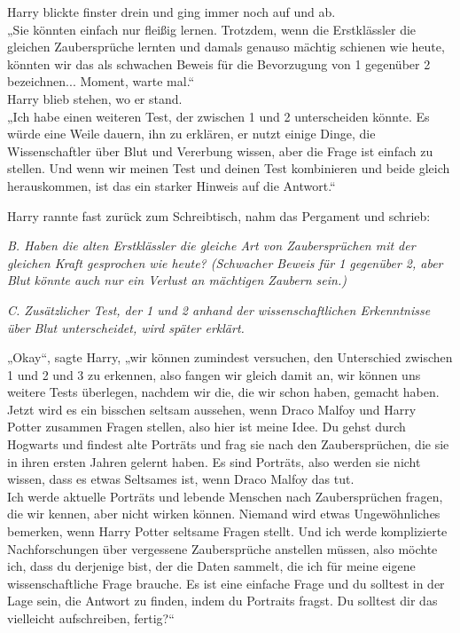 {Harry blickte finster drein und ging immer noch auf und ab.\\ „Sie könnten einfach nur fleißig lernen. Trotzdem, wenn die Erstklässler die gleichen Zaubersprüche lernten und damals genauso mächtig schienen wie heute, könnten wir das als schwachen Beweis für die Bevorzugung von 1 gegenüber 2 bezeichnen... Moment, warte mal.“\\ Harry blieb stehen, wo er stand.\\ „Ich habe einen weiteren Test, der zwischen 1 und 2 unterscheiden könnte. Es würde eine Weile dauern, ihn zu erklären, er nutzt einige Dinge, die Wissenschaftler über Blut und Vererbung wissen, aber die Frage ist einfach zu stellen. Und wenn wir meinen Test und deinen Test kombinieren und beide gleich herauskommen, ist das ein starker Hinweis auf die Antwort.“

Harry rannte fast zurück zum Schreibtisch, nahm das Pergament und schrieb:

\emph{B. Haben die alten Erstklässler die gleiche Art von Zaubersprüchen mit der gleichen Kraft gesprochen wie heute? (Schwacher Beweis für 1 gegenüber 2, aber Blut könnte auch nur ein Verlust an mächtigen Zaubern sein.)}

\emph{C. Zusätzlicher Test, der 1 und 2 anhand der wissenschaftlichen Erkenntnisse über Blut unterscheidet, wird später erklärt.}

„Okay“, sagte Harry, „wir können zumindest versuchen, den Unterschied zwischen 1 und 2 und 3 zu erkennen, also fangen wir gleich damit an, wir können uns weitere Tests überlegen, nachdem wir die, die wir schon haben, gemacht haben. Jetzt wird es ein bisschen seltsam aussehen, wenn Draco Malfoy und Harry Potter zusammen Fragen stellen, also hier ist meine Idee. Du gehst durch Hogwarts und findest alte Porträts und frag sie nach den Zaubersprüchen, die sie in ihren ersten Jahren gelernt haben. Es sind Porträts, also werden sie nicht wissen, dass es etwas Seltsames ist, wenn Draco Malfoy das tut.\\ Ich werde aktuelle Porträts und lebende Menschen nach Zaubersprüchen fragen, die wir kennen, aber nicht wirken können. Niemand wird etwas Ungewöhnliches bemerken, wenn Harry Potter seltsame Fragen stellt. Und ich werde komplizierte Nachforschungen über vergessene Zaubersprüche anstellen müssen, also möchte ich, dass du derjenige bist, der die Daten sammelt, die ich für meine eigene wissenschaftliche Frage brauche. Es ist eine einfache Frage und du solltest in der Lage sein, die Antwort zu finden, indem du Portraits fragst. Du solltest dir das vielleicht aufschreiben, fertig?“

}
